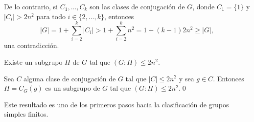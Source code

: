 De lo contrario, si $C_1,\dots,C_k$ son las clases de conjugación de $G$, donde 
$C_1=\{1\}$ y $|C_i|>2n^2$ para todo $i\in\{2,\dots,k\}$, entonces 
\[
|G|=1+\sum_{i=2}^k|C_i|>1+\sum_{i=2}^kn^2=1+(k-1)2n^2\geq |G|,
\]
una contradicción. 

\begin{claim}
Existe un subgrupo $H$ de $G$ tal que $(G:H)\leq 2n^2$.
\end{claim}

Sea $C$ alguna clase de conjugación de $G$ tal que $|C|\leq 2n^2$ y sea $g\in C$.  
Entonces $H=C_G(g)$ es un subgrupo de $G$ tal que $(G:H)\leq 2n^2$.\qed

\medskip
Este resultado es uno de los primeros pasos hacia la clasificación de grupos simples finitos. 